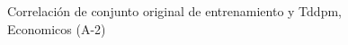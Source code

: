 \begin{figure}[H]
    \centering
    
    \caption{Correlación de conjunto original de entrenamiento y Tddpm, Economicos (A-2)}
    \label{pairwise-economicos-a-2-tddpm_mlp}
\end{figure}